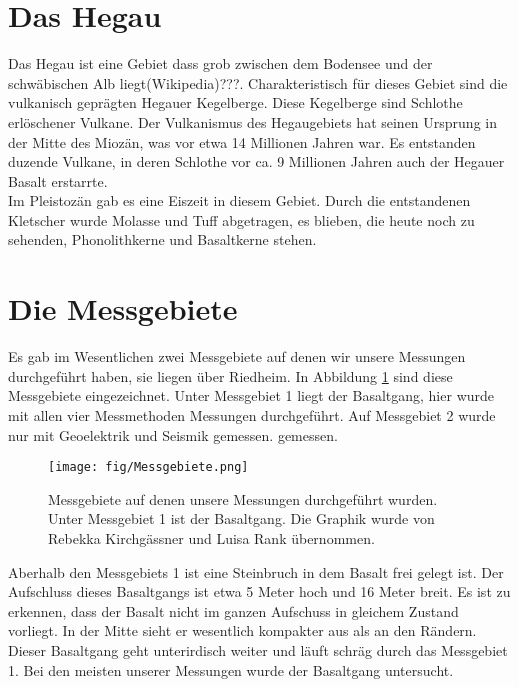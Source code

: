 
\section{Das Hegau}
Das Hegau ist eine Gebiet dass grob zwischen dem Bodensee und der schwäbischen Alb liegt(Wikipedia)???. Charakteristisch für dieses Gebiet sind die vulkanisch 
geprägten Hegauer Kegelberge. Diese Kegelberge sind Schlothe erlöschener Vulkane. Der Vulkanismus des Hegaugebiets hat seinen Ursprung in der Mitte des Miozän, 
was vor etwa 14 Millionen Jahren war. Es entstanden duzende Vulkane, in deren Schlothe vor ca. 9 Millionen Jahren auch der Hegauer Basalt erstarrte.\\
Im Pleistozän gab es eine Eiszeit in diesem Gebiet. Durch die entstandenen Kletscher wurde Molasse und Tuff abgetragen, es blieben, die heute noch zu sehenden, 
Phonolithkerne und Basaltkerne stehen. 



\newpage


\section{Die Messgebiete}


Es gab im Wesentlichen zwei Messgebiete auf denen wir unsere Messungen durchgeführt haben, sie liegen über Riedheim. In Abbildung \ref{abb:Messgebiete} sind diese Messgebiete 
eingezeichnet. Unter Messgebiet 1 liegt der Basaltgang, hier wurde mit allen vier Messmethoden Messungen durchgeführt. 
Auf Messgebiet 2 wurde nur mit Geoelektrik und Seismik gemessen.
gemessen.
\begin{figure}[h]
 \centering
 \texttt{[image: fig/Messgebiete.png]}
 \caption[Messgebiete]{Messgebiete auf denen unsere Messungen durchgeführt wurden. Unter Messgebiet 1 ist der Basaltgang. Die Graphik wurde von Rebekka Kirchgässner und Luisa Rank übernommen.}
 \label{abb:Messgebiete}
\end{figure}

Aberhalb den Messgebiets 1 ist eine Steinbruch in dem Basalt frei gelegt ist. Der Aufschluss dieses Basaltgangs ist etwa 5 Meter hoch und 16 Meter breit. 
Es ist zu erkennen, dass der Basalt nicht im ganzen Aufschuss in gleichem Zustand vorliegt. In der Mitte sieht er wesentlich kompakter aus als an den Rändern.
Dieser Basaltgang geht unterirdisch weiter und läuft schräg durch das Messgebiet 1. Bei den meisten unserer Messungen wurde der Basaltgang untersucht.


